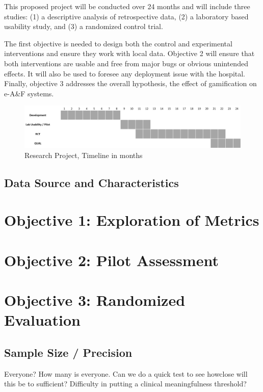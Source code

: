 This proposed project will be conducted over 24 months and will include three studies: (1) a descriptive analysis of retrospective data, (2) a laboratory based usability study, and (3) a randomized control trial.

 The first objective is needed to design both the control and experimental interventions and ensure they work with local data. Objective 2 will ensure that both interventions are usable and free from major bugs or obvious unintended effects. It will also be used to foresee any deployment issue with the hospital. Finally, objective 3 addresses the overall hypothesis, the effect of gamification on e-A\&F systems.

\begin{figure}[h]
    \centering
    \includegraphics[width=\textwidth]{img/timeline-overall.PNG}
    \caption{Research Project, Timeline in months}
    \label{fig:timeline}
\end{figure}

\section{Data Source and Characteristics}


\chapter{Objective 1: Exploration of Metrics}


\chapter{Objective 2: Pilot Assessment}


\chapter{Objective 3: Randomized Evaluation}


\section{Sample Size / Precision}
Everyone?  How many is everyone.  Can we do a quick test to see howclose will this be to sufficient?  Difficulty in putting a clinical meaningfulness threshold?

